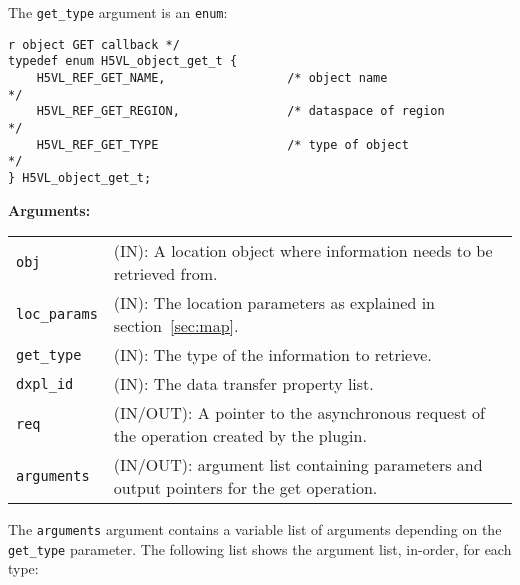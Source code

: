 The {\tt get\_type} argument is an {\tt enum}:
\begin{lstlisting}
r object GET callback */
typedef enum H5VL_object_get_t {
    H5VL_REF_GET_NAME,                 /* object name                       */
    H5VL_REF_GET_REGION,               /* dataspace of region               */
    H5VL_REF_GET_TYPE                  /* type of object                    */
} H5VL_object_get_t;
\end{lstlisting}

\textbf{Arguments:}\\
\begin{tabular}{l p{10cm}}
  {\tt obj} & (IN): A location object where information needs to be
  retrieved from.\\
  {\tt loc\_params} & (IN): The location parameters as
  explained in section~\ref{sec:map}.\\
  {\tt get\_type} & (IN): The type of the information to retrieve.\\
  {\tt dxpl\_id} & (IN): The data transfer property list.\\
  {\tt req} & (IN/OUT): A pointer to the asynchronous request of the
  operation created by the plugin.\\
  {\tt arguments} & (IN/OUT): argument list containing parameters and
  output pointers for the get operation. \\
\end{tabular}

The {\tt arguments} argument contains a variable list of arguments
depending on the {\tt get\_type} parameter. The following list shows
the argument list, in-order, for each type:

